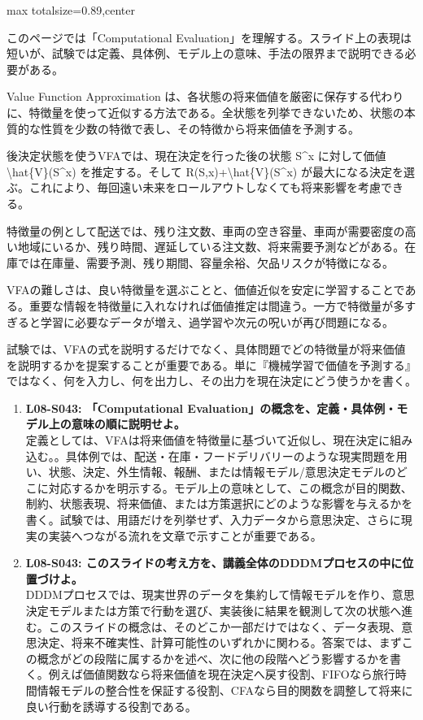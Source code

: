 \begin{minipage}[t]{0.58\textwidth}
\begin{adjustbox}{max totalsize={\textwidth}{0.89\textheight},center}
\begin{minipage}{\textwidth}\scriptsize
{}このページでは「Computational Evaluation」を理解する。スライド上の表現は短いが、試験では定義、具体例、モデル上の意味、手法の限界まで説明できる必要がある。\par
Value Function Approximation は、各状態の将来価値を厳密に保存する代わりに、特徴量を使って近似する方法である。全状態を列挙できないため、状態の本質的な性質を少数の特徴で表し、その特徴から将来価値を予測する。\par
後決定状態を使うVFAでは、現在決定を行った後の状態 S\textasciicircum{}x に対して価値 \textbackslash{}hat\{V\}(S\textasciicircum{}x) を推定する。そして R(S,x)+\textbackslash{}hat\{V\}(S\textasciicircum{}x) が最大になる決定を選ぶ。これにより、毎回遠い未来をロールアウトしなくても将来影響を考慮できる。\par
特徴量の例として配送では、残り注文数、車両の空き容量、車両が需要密度の高い地域にいるか、残り時間、遅延している注文数、将来需要予測などがある。在庫では在庫量、需要予測、残り期間、容量余裕、欠品リスクが特徴になる。\par
VFAの難しさは、良い特徴量を選ぶことと、価値近似を安定に学習することである。重要な情報を特徴量に入れなければ価値推定は間違う。一方で特徴量が多すぎると学習に必要なデータが増え、過学習や次元の呪いが再び問題になる。\par
試験では、VFAの式を説明するだけでなく、具体問題でどの特徴量が将来価値を説明するかを提案することが重要である。単に『機械学習で価値を予測する』ではなく、何を入力し、何を出力し、その出力を現在決定にどう使うかを書く。\par{}\begin{enumerate}\item \textbf{L08-S043: 「Computational Evaluation」の概念を、定義・具体例・モデル上の意味の順に説明せよ。}\\定義としては、VFAは将来価値を特徴量に基づいて近似し、現在決定に組み込む。。具体例では、配送・在庫・フードデリバリーのような現実問題を用い、状態、決定、外生情報、報酬、または情報モデル/意思決定モデルのどこに対応するかを明示する。モデル上の意味として、この概念が目的関数、制約、状態表現、将来価値、または方策選択にどのような影響を与えるかを書く。試験では、用語だけを列挙せず、入力データから意思決定、さらに現実の実装へつながる流れを文章で示すことが重要である。\item \textbf{L08-S043: このスライドの考え方を、講義全体のDDDMプロセスの中に位置づけよ。}\\DDDMプロセスでは、現実世界のデータを集約して情報モデルを作り、意思決定モデルまたは方策で行動を選び、実装後に結果を観測して次の状態へ進む。このスライドの概念は、そのどこか一部だけではなく、データ表現、意思決定、将来不確実性、計算可能性のいずれかに関わる。答案では、まずこの概念がどの段階に属するかを述べ、次に他の段階へどう影響するかを書く。例えば価値関数なら将来価値を現在決定へ戻す役割、FIFOなら旅行時間情報モデルの整合性を保証する役割、CFAなら目的関数を調整して将来に良い行動を誘導する役割である。\end{enumerate}

\end{minipage}
\end{adjustbox}
\end{minipage}

